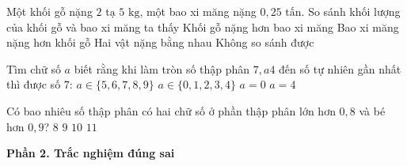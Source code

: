 \begin{ex} %
Một khối gỗ nặng $2\text{ tạ } 5\text{ kg}$, một bao xi măng nặng $0{,}25\text{ tấn}$. So sánh khối lượng của khối gỗ và bao xi măng ta thấy
\choice
{Khối gỗ nặng hơn bao xi măng}
{\True Bao xi măng nặng hơn khối gỗ}
{Hai vật nặng bằng nhau}
{Không so sánh được}
\end{ex}

\begin{ex} %
Tìm chữ số $a$ biết rằng khi làm tròn số thập phân $7{,}a4$ đến số tự nhiên gần nhất thì được số $7$:
\choice
{$a \in \{5, 6, 7, 8, 9\}$}
{\True $a \in \{0, 1, 2, 3, 4\}$}
{$a = 0$}
{$a = 4$}
\end{ex}

\begin{ex} %
Có bao nhiêu số thập phân có hai chữ số ở phần thập phân lớn hơn $0{,}8$ và bé hơn $0{,}9$?
\choice
{$8$}
{\True $9$}
{$10$}
{$11$}
\end{ex}

\textbf{Phần 2. Trắc nghiệm đúng sai}

